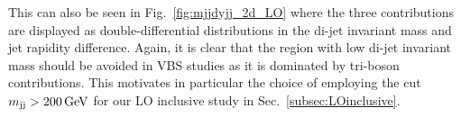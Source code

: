 This can also be seen in Fig.~\ref{fig:mjjdyjj_2d_LO} where the three contributions are displayed as double-differential distributions in the di-jet invariant mass and jet rapidity difference.
Again, it is clear that the region with low di-jet invariant mass should be avoided in VBS studies as it is dominated by tri-boson contributions.
This motivates in particular the choice of employing the cut $m_{\text{j}\text{j}} > 200\,\text{GeV}$ for our LO inclusive study in Sec.~\ref{subsec:LOinclusive}.

